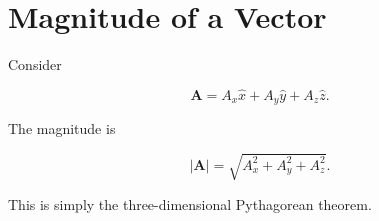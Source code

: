 \section{Magnitude of a Vector}

Consider

\[
\mathbf A=
A_x\hat x
+
A_y\hat y
+
A_z\hat z.
\]

The magnitude is

\[
|\mathbf A|
=
\sqrt{
	A_x^2
	+
	A_y^2
	+
	A_z^2
}.
\]

This is simply the three-dimensional Pythagorean theorem.

